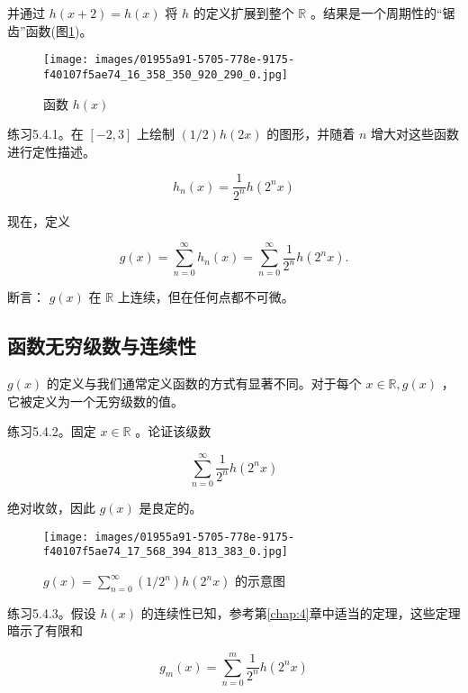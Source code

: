 并通过 \(h\left( {x + 2}\right)  = h\left( x\right)\) 将 \(h\) 的定义扩展到整个 \(\mathbb{R}\) 。结果是一个周期性的“锯齿”函数(图\ref{fig:5.6})。

\begin{figure}[h]
  \centering
  \texttt{[image: images/01955a91-5705-778e-9175-f40107f5ae74\_16\_358\_350\_920\_290\_0.jpg]}
  \caption{函数 \(h\left( x\right)\) }
  \label{fig:5.6}
\end{figure}


练习5.4.1。在 \(\left\lbrack  {-2,3}\right\rbrack\) 上绘制 \(\left( {1/2}\right) h\left( {2x}\right)\) 的图形，并随着 \(n\) 增大对这些函数进行定性描述。

\[
{h}_{n}\left( x\right)  = \frac{1}{{2}^{n}}h\left( {{2}^{n}x}\right)
\]


现在，定义

\[
g\left( x\right)  = \mathop{\sum }\limits_{{n = 0}}^{\infty }{h}_{n}\left( x\right)  = \mathop{\sum }\limits_{{n = 0}}^{\infty }\frac{1}{{2}^{n}}h\left( {{2}^{n}x}\right) .
\]

断言： \(g\left( x\right)\) 在 \(\mathbb{R}\) 上连续，但在任何点都不可微。

\subsection{函数无穷级数与连续性}

\(g\left( x\right)\) 的定义与我们通常定义函数的方式有显著不同。对于每个 \(x \in  \mathbb{R},g\left( x\right)\) ，它被定义为一个无穷级数的值。

练习5.4.2。固定 \(x \in  \mathbb{R}\) 。论证该级数

\[
\mathop{\sum }\limits_{{n = 0}}^{\infty }\frac{1}{{2}^{n}}h\left( {{2}^{n}x}\right)
\]

绝对收敛，因此 \(g\left( x\right)\) 是良定的。

\begin{figure}[h]
  \centering
  \texttt{[image: images/01955a91-5705-778e-9175-f40107f5ae74\_17\_568\_394\_813\_383\_0.jpg]}
  \caption{\(g\left( x\right)  = \mathop{\sum }\limits_{{n = 0}}^{\infty }\left( {1/{2}^{n}}\right) h\left( {{2}^{n}x}\right)\) 的示意图}
  \label{fig:5.7}
\end{figure}


练习5.4.3。假设 \(h\left( x\right)\) 的连续性已知，参考第\ref{chap:4}章中适当的定理，这些定理暗示了有限和

\[
{g}_{m}\left( x\right)  = \mathop{\sum }\limits_{{n = 0}}^{m}\frac{1}{{2}^{n}}h\left( {{2}^{n}x}\right)
\]

